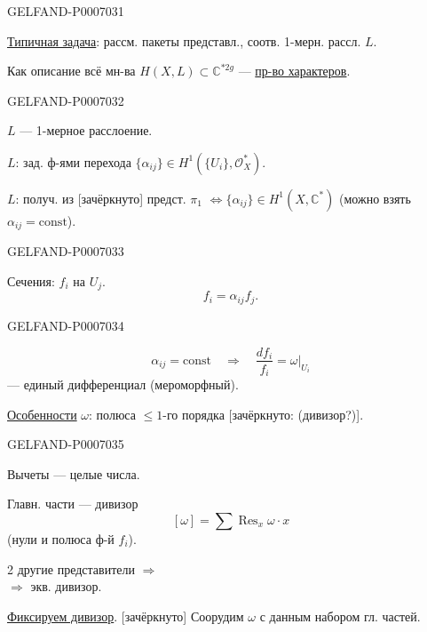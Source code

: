\begin{GelfandAdjacentEvidence}{GELFAND-P000703}{1}

\underline{Типичная задача}: рассм. пакеты представл., соотв. 1-мерн. рассл. \(L\).

Как описание всё мн-ва \(H(X,L)\subset\mathbb C^{*2g}\) --- \underline{пр-во характеров}.
\end{GelfandAdjacentEvidence}
\begin{GelfandAdjacentEvidence}{GELFAND-P000703}{2}


\(L\) --- 1-мерное расслоение.

\(L\): зад. ф-ями перехода \(\{\alpha_{ij}\}\in H^1(\{U_i\},\mathcal O_X^*)\).

\(L\): получ. из [зачёркнуто] предст. \(\pi_1\)
\(\Leftrightarrow \{\alpha_{ij}\}\in H^1(X,\mathbb C^*)\)
(можно взять \(\alpha_{ij}=\mathrm{const}\)).
\end{GelfandAdjacentEvidence}
\begin{GelfandAdjacentEvidence}{GELFAND-P000703}{3}


Сечения: \(f_i\) на \(U_j\).
\[
f_i=\alpha_{ij}f_j.
\]
\end{GelfandAdjacentEvidence}
\begin{GelfandAdjacentEvidence}{GELFAND-P000703}{4}

\[
\alpha_{ij}=\mathrm{const}\quad\Rightarrow\quad
\frac{df_i}{f_i}=\omega\big|_{U_i}
\]
--- единый дифференциал (мероморфный).

\underline{Особенности} \(\omega\): полюса \(\le 1\)-го порядка [зачёркнуто: (дивизор?)].
\end{GelfandAdjacentEvidence}
\begin{GelfandAdjacentEvidence}{GELFAND-P000703}{5}


Вычеты --- целые числа.

Главн. части --- дивизор
\[
[\omega]=\sum\operatorname{Res}_x\omega\cdot x
\]
(нули и полюса ф-й \(f_i\)).

2 другие представители \(\Rightarrow\)\\
\(\Rightarrow\) экв. дивизор.

\underline{Фиксируем дивизор}. [зачёркнуто] Соорудим \(\omega\) с данным набором гл. частей.
\end{GelfandAdjacentEvidence}
